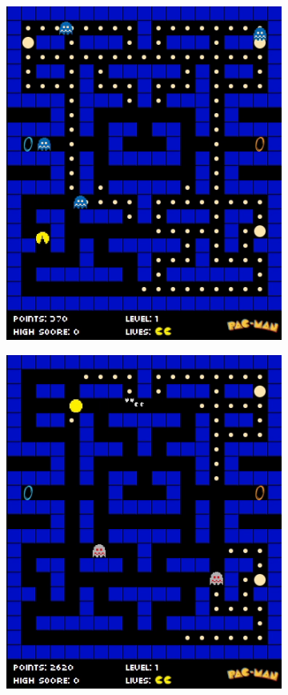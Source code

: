 \documentclass[12pt,a4paper]{report}
\begin{document}
\begin{figure}[hb!]
\begin{subfigure}{.32\textwidth}
  \centering
  \includegraphics[width=.95\linewidth]{frightened_snap}
  \caption{}
  \label{fig:snap1}
\end{subfigure}%
\begin{subfigure}{.32\textwidth}
  \centering
  \includegraphics[width=.95\linewidth]{eaten_snap}

\end{subfigure}
\end{figure}
\end{document}
